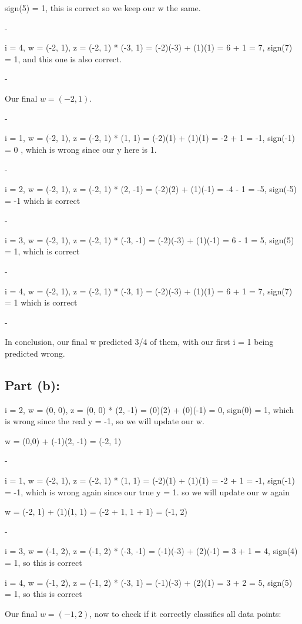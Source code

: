 \documentclass{article}
\begin{document}
sign(5) = 1, this is correct so we keep our w the same.

-

i = 4, w = (-2, 1), z = (-2, 1) * (-3, 1) = (-2)(-3) + (1)(1) = 6 + 1 = 7, sign(7) = 1, and this one is also correct.

-

Our final $w = (-2, 1)$. 

-

i = 1, w = (-2, 1), z = (-2, 1) * (1, 1) = (-2)(1) + (1)(1) = -2 + 1 = -1, sign(-1) = 0 , which is wrong since our y here is 1.

-

i = 2, w = (-2, 1), z = (-2, 1) * (2, -1) = (-2)(2) + (1)(-1) = -4 - 1 = -5, sign(-5) = -1 which is correct

-

i = 3, w = (-2, 1), z = (-2, 1) * (-3, -1) = (-2)(-3) + (1)(-1) = 6 - 1 = 5, sign(5) = 1, which is correct

-

i = 4, w = (-2, 1), z = (-2, 1) * (-3, 1) = (-2)(-3) + (1)(1) = 6 + 1 = 7, sign(7) = 1 which is correct

-

In conclusion, our final w predicted 3/4 of them, with our first i = 1 being predicted wrong. 

\subsection*{Part (b):}

i = 2, w = (0, 0), z = (0, 0) * (2, -1) = (0)(2) + (0)(-1) = 0, sign(0) = 1, which is wrong since the real y = -1, so we will update our w. 


w = (0,0) + (-1)(2, -1) = (-2, 1)

-

i = 1, w = (-2, 1), z = (-2, 1) * (1, 1) = (-2)(1) + (1)(1) = -2 + 1 = -1, sign(-1) = -1, which is wrong again since our true y = 1. so we will update our w again

w = (-2, 1) + (1)(1, 1) = (-2 + 1, 1 + 1) = (-1, 2)

-

i = 3, w = (-1, 2), z = (-1, 2) * (-3, -1) = (-1)(-3) + (2)(-1) = 3 + 1 = 4, sign(4) = 1, so this is correct

i = 4, w = (-1, 2), z = (-1, 2) * (-3, 1) = (-1)(-3) + (2)(1) = 3 + 2 = 5, sign(5) = 1, so this is correct


Our final $w = (-1, 2)$, now to check if it correctly classifies all data points:
\end{document}
